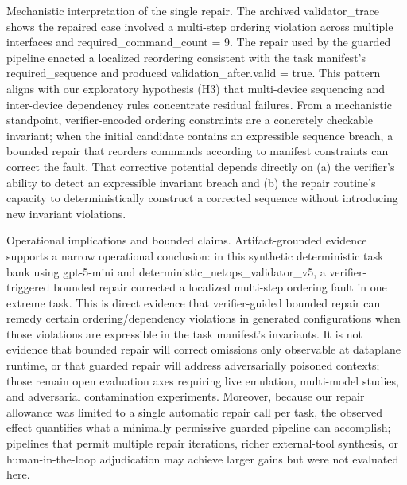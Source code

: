 \documentclass[conference]{IEEEtran}
\begin{document}
Mechanistic interpretation of the single repair. The archived validator\_trace shows the repaired case involved a multi-step ordering violation across multiple interfaces and required\_command\_count = 9. The repair used by the guarded pipeline enacted a localized reordering consistent with the task manifest's required\_sequence and produced validation\_after.valid = true. This pattern aligns with our exploratory hypothesis (H3) that multi-device sequencing and inter-device dependency rules concentrate residual failures. From a mechanistic standpoint, verifier-encoded ordering constraints are a concretely checkable invariant; when the initial candidate contains an expressible sequence breach, a bounded repair that reorders commands according to manifest constraints can correct the fault. That corrective potential depends directly on (a) the verifier's ability to detect an expressible invariant breach and (b) the repair routine's capacity to deterministically construct a corrected sequence without introducing new invariant violations.

Operational implications and bounded claims. Artifact-grounded evidence supports a narrow operational conclusion: in this synthetic deterministic task bank using gpt-5-mini and deterministic\_netops\_validator\_v5, a verifier-triggered bounded repair corrected a localized multi-step ordering fault in one extreme task. This is direct evidence that verifier-guided bounded repair can remedy certain ordering/dependency violations in generated configurations when those violations are expressible in the task manifest's invariants. It is not evidence that bounded repair will correct omissions only observable at dataplane runtime, or that guarded repair will address adversarially poisoned contexts; those remain open evaluation axes requiring live emulation, multi-model studies, and adversarial contamination experiments. Moreover, because our repair allowance was limited to a single automatic repair call per task, the observed effect quantifies what a minimally permissive guarded pipeline can accomplish; pipelines that permit multiple repair iterations, richer external-tool synthesis, or human-in-the-loop adjudication may achieve larger gains but were not evaluated here.
\end{document}
